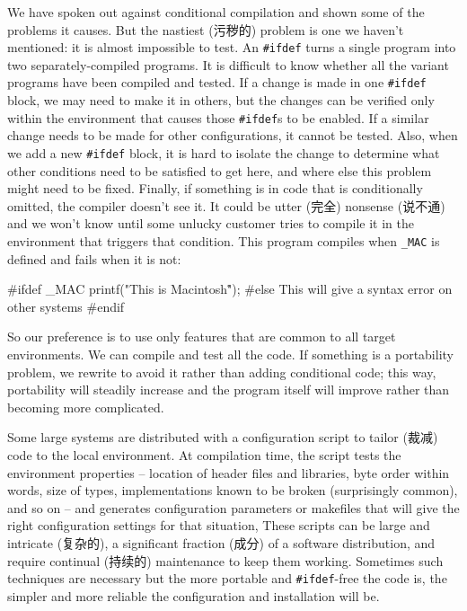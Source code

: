 We have spoken out against conditional compilation and shown some of the
problems it causes. But the nastiest (污秽的) problem is one we haven't
mentioned: it is almost impossible to test. An \verb'#ifdef' turns a single
program into two separately-compiled programs. It is difficult to know
whether all the variant programs have been compiled and tested. If a change
is made in one \verb'#ifdef' block, we may need to make it in others, but
the changes can be verified only within the environment that causes those
\verb'#ifdef's to be enabled. If a similar change needs to be made for
other configurations, it cannot be tested. Also, when we add a new
\verb'#ifdef' block, it is hard to isolate the change to determine what
other conditions need to be satisfied to get here, and where else this
problem might need to be fixed. Finally, if something is in code that is
conditionally omitted, the compiler doesn't see it. It could be utter
(完全) nonsense (说不通) and we won't know until some unlucky customer
tries to compile it in the environment that triggers that condition. This
program compiles when \verb'_MAC' is defined and fails when it is not:
\begin{wellcode}
    #ifdef _MAC
        printf("This is Macintosh\r");
    #else
        This will give a syntax error on other systems
    #endif
\end{wellcode}

So our preference is to use only features that are common to all target
environments. We can compile and test all the code. If something is a
portability problem, we rewrite to avoid it rather than adding conditional
code; this way, portability will steadily increase and the program itself
will improve rather than becoming more complicated.

Some large systems are distributed with a configuration script to tailor
(裁减) code to the local environment. At compilation time, the script tests
the environment properties -- location of header files and libraries, byte
order within words, size of types, implementations known to be broken
(surprisingly common), and so on -- and generates configuration parameters
or makefiles that will give the right configuration settings for that
situation, These scripts can be large and intricate (复杂的), a significant
fraction (成分) of a software distribution, and require continual (持续的)
maintenance to keep them working. Sometimes such techniques are necessary
but the more portable and \verb'#ifdef'-free the code is, the simpler and
more reliable the configuration and installation will be.

